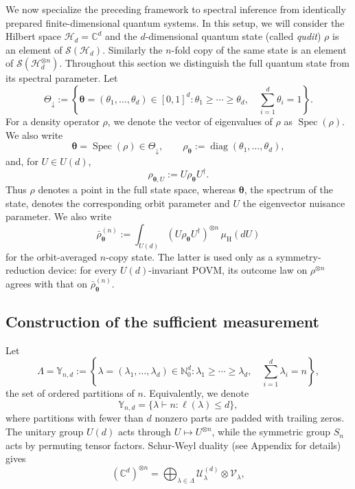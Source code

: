 \documentclass{article}
\theoremstyle{named}
\theoremstyle{named1}
\newcommand{\btheta}{\boldsymbol{\theta}}
\newcommand{\bbC}{\mathbb C}
\newcommand{\cH}{\mathcal H}
\newcommand{\cU}{\mathcal U}
\newcommand{\cV}{\mathcal V}
\newcommand{\cS}{\mathcal S}
\newcommand{\Haar}{\mu_{\mathrm H}}
\newcommand{\spec}{\operatorname{Spec}}
\theoremstyle{plain}
\theoremstyle{remark}
\begin{document}
We now specialize the preceding framework to spectral inference from
identically prepared finite-dimensional quantum systems.
In this setup, we will consider the Hilbert space $\cH_d=\bbC^d$ and the $d$-dimensional quantum state (called \emph{qudit}) $\rho$ is an element of $\cS(\cH_d)$. Similarly the $n$-fold copy of the same state is an element of $\cS(\cH_d^{\otimes n})$. Throughout this section we distinguish the full quantum state from its
spectral parameter.  
Let \[
    \Theta_{\downarrow}
    :=\left\{
      \btheta=(\theta_1,\ldots,\theta_d)\in[0,1]^d:
      \theta_1\geq\cdots\geq\theta_d,\quad
      \sum_{i=1}^d\theta_i=1
    \right\}.
\]
For a density operator $\rho$, we denote the vector of eigenvalues of $\rho$ as $\spec(\rho)$. We also write
\[
    \btheta=\spec(\rho)\in\Theta_{\downarrow},
    \qquad
    \rho_{\btheta}:=\operatorname{diag}(\theta_1,\ldots,\theta_d),
\]
and, for $U\in U(d)$,
\[
    \rho_{\btheta,U}:=U\rho_{\btheta}U^{\dagger}.
\]
Thus $\rho$ denotes a point in the full state space, whereas
$\btheta$, the spectrum of the state, denotes the corresponding orbit parameter and $U$ the
eigenvector nuisance parameter.  We also write
\[
    \bar\rho_{\btheta}^{(n)}
    :=
    \int_{U(d)}
      (U\rho_{\btheta}U^{\dagger})^{\otimes n}\,\Haar(dU)
\]
for the orbit-averaged $n$-copy state.  The latter is used only as a
symmetry-reduction device: for every $U(d)$-invariant POVM, its outcome
law on $\rho^{\otimes n}$ agrees with that on
$\bar\rho_{\btheta}^{(n)}$.  


\subsection{Construction of the sufficient measurement}

Let
\[
    \Lambda=\mathbb Y_{n,d}
    :=
    \left\{
        \lambda=(\lambda_1,\ldots,\lambda_d)\in\mathbb N_0^d:
        \lambda_1\geq\cdots\geq\lambda_d,\quad
        \sum_{i=1}^d\lambda_i=n
    \right\},
\]
the set of ordered partitions of $n$. Equivalently, we denote
\[
    \mathbb Y_{n,d}
    =
    \{\lambda\vdash n:\ell(\lambda)\leq d\},
\]
where partitions with fewer than $d$ nonzero parts are padded with
trailing zeros.
The unitary group $U(d)$
acts through $U\mapsto U^{\otimes n}$, while the symmetric group $S_n$ acts by
permuting tensor factors. Schur-Weyl duality (see Appendix for details) gives
\begin{equation}
    (\bbC^d)^{\otimes n}
    =
    \bigoplus_{\lambda\in\Lambda}
    \cU_\lambda^{(d)}\otimes\cV_\lambda,
\label{eq:Schur_Weyl}
\end{equation}
\end{document}
